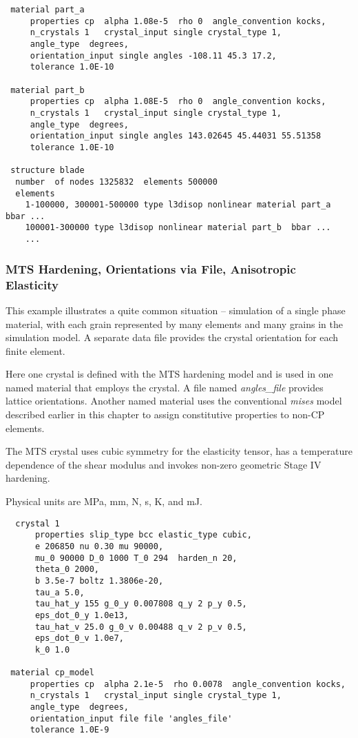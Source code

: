 \documentclass[11pt]{report}
\numberwithin{equation}{section}
\newcommand{\ti}{\emph}
\begin{document}
{\begin{verbatim}
 material part_a
     properties cp  alpha 1.08e-5  rho 0  angle_convention kocks,
     n_crystals 1   crystal_input single crystal_type 1,
     angle_type  degrees,
     orientation_input single angles -108.11 45.3 17.2,
     tolerance 1.0E-10

 material part_b
     properties cp  alpha 1.08E-5  rho 0  angle_convention kocks,
     n_crystals 1   crystal_input single crystal_type 1,
     angle_type  degrees,
     orientation_input single angles 143.02645 45.44031 55.51358
     tolerance 1.0E-10

 structure blade
  number  of nodes 1325832  elements 500000
  elements
    1-100000, 300001-500000 type l3disop nonlinear material part_a  bbar ...
    100001-300000 type l3disop nonlinear material part_b  bbar ...
    ...
\end{verbatim}
\small


\subsubsection{MTS Hardening, Orientations via File, Anisotropic Elasticity}
This example illustrates a quite common situation -- simulation of a single phase
material, with each grain represented by many elements and many grains in the 
simulation model. A separate data file provides the crystal orientation 
for each finite element.

Here one crystal is defined with the MTS hardening model
and is used in one named material that employs the crystal. A file 
named \ti{angles\_file} provides
lattice orientations.
Another named material uses the conventional \ti{mises} model described earlier
in this chapter to assign constitutive properties to non-CP elements.

The MTS crystal uses cubic symmetry for the elasticity tensor, has a
temperature dependence of the shear modulus and invokes
non-zero geometric Stage IV hardening.

Physical units are MPa, mm, N, s, K, and mJ. 

\small
\begin{verbatim}
  crystal 1
      properties slip_type bcc elastic_type cubic,
      e 206850 nu 0.30 mu 90000,
      mu_0 90000 D_0 1000 T_0 294  harden_n 20,
      theta_0 2000,
      b 3.5e-7 boltz 1.3806e-20,
      tau_a 5.0,
      tau_hat_y 155 g_0_y 0.007808 q_y 2 p_y 0.5,
      eps_dot_0_y 1.0e13,
      tau_hat_v 25.0 g_0_v 0.00488 q_v 2 p_v 0.5,
      eps_dot_0_v 1.0e7, 
      k_0 1.0

 material cp_model
     properties cp  alpha 2.1e-5  rho 0.0078  angle_convention kocks,
     n_crystals 1   crystal_input single crystal_type 1,
     angle_type  degrees,
     orientation_input file file 'angles_file'
     tolerance 1.0E-9


\end{verbatim}}
\end{document}
